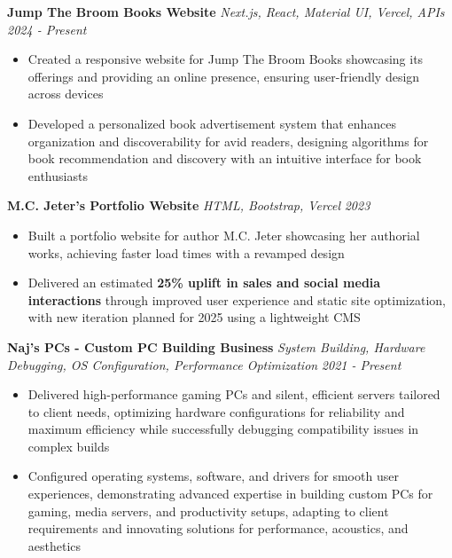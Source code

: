 \documentclass[letterpaper]{article}
\newenvironment{tightitemize}{%
  \begin{itemize}\small\setlength{\baselineskip}{0.95\baselineskip}\itemsep -1mm%
}{\end{itemize}}
\begin{document}
    {\textbf{Jump The Broom Books Website}} {\sl Next.js, React, Material UI, Vercel, APIs} \hfill \textsl{2024 - Present}\\
    \vspace{-2mm}
    \begin{tightitemize} \itemsep -1mm

        \item Created a responsive website for Jump The Broom Books showcasing its offerings and providing an online presence, ensuring user-friendly design across devices
        
        \item Developed a personalized book advertisement system that enhances organization and discoverability for avid readers, designing algorithms for book recommendation and discovery with an intuitive interface for book enthusiasts
        
    \end{tightitemize}
    \vspace{-2mm}

    {\textbf{M.C. Jeter's Portfolio Website}} {\sl HTML, Bootstrap, Vercel} \hfill \textsl{2023}\\
    \vspace{-2mm}
    \begin{tightitemize} \itemsep -1mm

        \item Built a portfolio website for author M.C. Jeter showcasing her authorial works, achieving faster load times with a revamped design
        
        \item Delivered an estimated \textbf{25\% uplift in sales and social media interactions} through improved user experience and static site optimization, with new iteration planned for 2025 using a lightweight CMS
        
    \end{tightitemize}
    \vspace{-2mm}

    {\textbf{Naj's PCs - Custom PC Building Business}} {\sl System Building, Hardware Debugging, OS Configuration, Performance Optimization} \hfill \textsl{2021 - Present}\\
    \vspace{-2mm}
    \begin{tightitemize} \itemsep -1mm

        \item Delivered high-performance gaming PCs and silent, efficient servers tailored to client needs, optimizing hardware configurations for reliability and maximum efficiency while successfully debugging compatibility issues in complex builds
        
        \item Configured operating systems, software, and drivers for smooth user experiences, demonstrating advanced expertise in building custom PCs for gaming, media servers, and productivity setups, adapting to client requirements and innovating solutions for performance, acoustics, and aesthetics
        
    \end{tightitemize}
    \vspace{-2mm}
\end{document}
